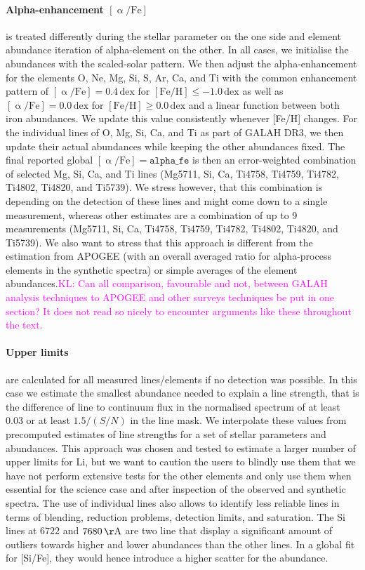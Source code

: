\documentclass[fleqn,usenatbib,useAMS]{mnras}
\newcommand\KL[1]{\textcolor{magenta}{KL: #1}}
\begin{document}
\paragraph*{Alpha-enhancement $\mathrm{[\upalpha/Fe]}$} is treated differently during the stellar parameter on the one side and element abundance iteration of alpha-element on the other. In all cases, we initialise the abundances with the scaled-solar pattern. We then adjust the alpha-enhancement for the elements O, Ne, Mg, Si, S, Ar, Ca, and Ti with the common enhancement pattern of $\mathrm{[\upalpha/Fe]} = 0.4\,\mathrm{dex}$ for $\mathrm{[Fe/H]} \leq -1.0\,\mathrm{dex}$ as well as $\mathrm{[\upalpha/Fe]} = 0.0\,\mathrm{dex}$ for $\mathrm{[Fe/H]} \geq 0.0\,\mathrm{dex}$ and a linear function between both iron abundances. We update this value consistently whenever [Fe/H] changes. For the individual lines of O, Mg, Si, Ca, and Ti as part of GALAH DR3, we then update their actual abundances while keeping the other abundances fixed. The final reported global $\mathrm{[\upalpha/Fe]} = \texttt{alpha\_fe}$ is then an error-weighted combination of selected Mg, Si, Ca, and Ti lines (Mg5711, Si, Ca, Ti4758, Ti4759, Ti4782, Ti4802, Ti4820, and Ti5739). We stress however, that this combination is depending on the detection of these lines and might come down to a single measurement, whereas other estimates are a combination of up to 9 measurements (Mg5711, Si, Ca, Ti4758, Ti4759, Ti4782, Ti4802, Ti4820, and Ti5739). We also want to stress that this approach is different from the estimation from APOGEE (with an overall averaged ratio for alpha-process elements in the synthetic spectra) or simple averages of the element abundances.\KL{Can all comparison, favourable and not, between GALAH analysis techniques to APOGEE and other surveys techniques be put in one section? It does not read so nicely to encounter arguments like these throughout the text.}

\paragraph*{Upper limits} are calculated for all measured lines/elements if no detection was possible. In this case we estimate the smallest abundance needed to explain a line strength, that is the difference of line to continuum flux in the normalised spectrum of at least 0.03 or at least $1.5/(S/N)$ in the line mask. We interpolate these values from precomputed estimates of line strengths for a set of stellar parameters and abundances. This approach was chosen and tested to estimate a larger number of upper limits for Li, but we want to caution the users to blindly use them that we have not perform extensive tests for the other elements and only use them when essential for the science case and after inspection of the observed and synthetic spectra. The use of individual lines also allows to identify less reliable lines in terms of blending, reduction problems, detection limits, and saturation. The Si lines at $6722$ and $7680\,\mathrm{\AA}$ are two line that display a significant amount of outliers towards higher and lower abundances than the other lines. In a global fit for [Si/Fe], they would hence introduce a higher scatter for the abundance.
\end{document}
